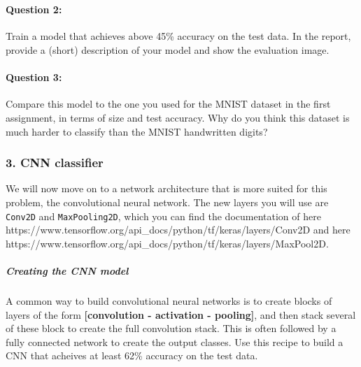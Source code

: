 \documentclass[11pt]{article}
\begin{document}
    \begin{center}
    \end{center}
    { \hspace*{\fill} \\}
    
    \hypertarget{question-2}{%
\paragraph{\texorpdfstring{\textbf{{Question
2:}}}{Question 2:}}\label{question-2}}

Train a model that achieves above 45\% accuracy on the test data. In the
report, provide a (short) description of your model and show the
evaluation image.

    \hypertarget{question-3}{%
\paragraph{\texorpdfstring{\textbf{{Question
3:}}}{Question 3:}}\label{question-3}}

Compare this model to the one you used for the MNIST dataset in the
first assignment, in terms of size and test accuracy. Why do you think
this dataset is much harder to classify than the MNIST handwritten
digits?

    \hypertarget{cnn-classifier}{%
\subsubsection{\texorpdfstring{\textbf{3. CNN
classifier}}{3. CNN classifier}}\label{cnn-classifier}}

We will now move on to a network architecture that is more suited for
this problem, the convolutional neural network. The new layers you will
use are \texttt{Conv2D} and \texttt{MaxPooling2D}, which you can find
the documentation of here
https://www.tensorflow.org/api\_docs/python/tf/keras/layers/Conv2D and
here
https://www.tensorflow.org/api\_docs/python/tf/keras/layers/MaxPool2D.

    \hypertarget{creating-the-cnn-model}{%
\subparagraph{\texorpdfstring{\textbf{Creating the CNN
model}}{Creating the CNN model}}\label{creating-the-cnn-model}}

A common way to build convolutional neural networks is to create blocks
of layers of the form \textbf{{[}convolution - activation - pooling{]}},
and then stack several of these block to create the full convolution
stack. This is often followed by a fully connected network to create the
output classes. Use this recipe to build a CNN that acheives at least
62\% accuracy on the test data.
\end{document}
